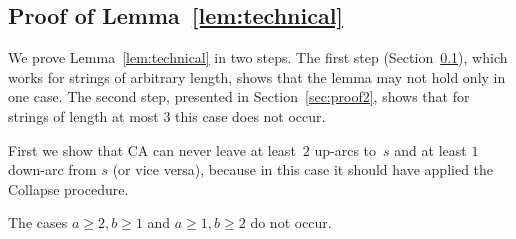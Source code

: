 \subsection{Proof of Lemma~\ref{lem:technical}}
\label{sec:proof1}
We prove Lemma~\ref{lem:technical} in two steps. The first step (Section~\ref{sec:proof1}), which works for strings of arbitrary length, shows that the lemma may not hold only in one case. The second step, presented in Section~\ref{sec:proof2}, shows that for strings of length at most $3$ this case does not occur.

First we show that CA can never leave at least~$2$ up-arcs to~$s$ and at least $1$ down-arc from $s$ (or vice versa), because in this case it should have applied the Collapse procedure.
\begin{lemma}
\label{lem:edgecases}
The cases $a \ge 2, b \ge 1$ and $a \ge 1, b \ge 2$ do not occur.
\end{lemma}

